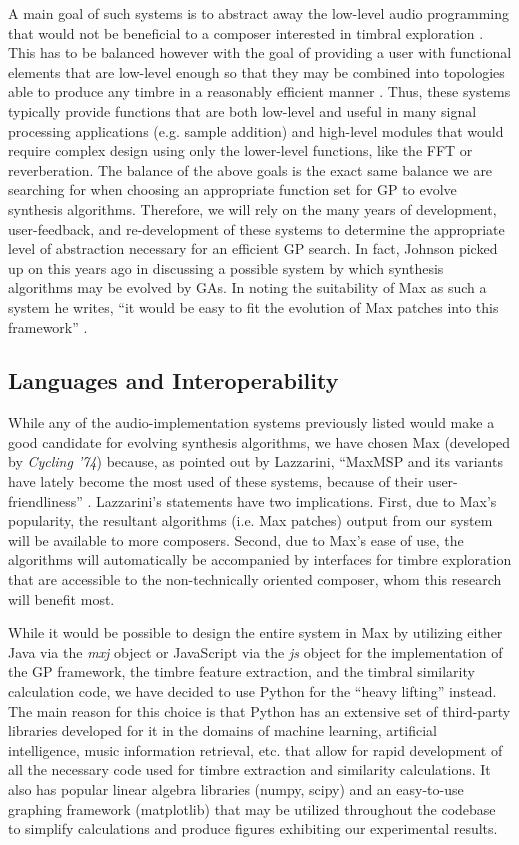 \documentclass[a4paper,12pt]{report} 	%
\numberwithin{figure}{chapter}
\numberwithin{table}{chapter}
\numberwithin{equation}{chapter}
\begin{document}
\begin{flushleft}
A main goal of such systems is to abstract away the low-level audio programming that would not be beneficial to a composer interested in timbral exploration \cite[p. 1]{Moreno:2005bs}. This has to be balanced however with the goal of providing a user with functional elements that are low-level enough so that they may be combined into topologies able to produce any timbre in a reasonably efficient manner \cite[p. 1]{Moreno:2005bs}. Thus, these systems typically provide functions that are both low-level and useful in many signal processing applications (e.g. sample addition) and high-level modules that would require complex design using only the lower-level functions, like the FFT or reverberation. The balance of the above goals is the exact same balance we are searching for when choosing an appropriate function set for GP to evolve synthesis algorithms. Therefore, we will rely on the many years of development, user-feedback, and re-development of these systems to determine the appropriate level of abstraction necessary for an efficient GP search. In fact, Johnson picked up on this years ago in discussing a possible system by which synthesis algorithms may be evolved by GAs. In noting the suitability of Max as such a system he writes, ``it would be easy to fit the evolution of Max patches into this framework'' \cite[p. 6]{Johnson:1998sh}.

\subsection{Languages and Interoperability}
While any of the audio-implementation systems previously listed would make a good candidate for evolving synthesis algorithms, we have chosen Max (developed by \emph{Cycling '74}) because, as pointed out by Lazzarini, ``MaxMSP and its variants have lately become the most used of these systems, because of their user-friendliness'' \cite[p. 356]{Lazzarini:2004qf}. Lazzarini's statements have two implications. First, due to Max's popularity, the resultant algorithms (i.e. Max patches) output from our system will be available to more composers. Second, due to Max's ease of use, the algorithms will automatically be accompanied by interfaces for timbre exploration that are accessible to the non-technically oriented composer, whom this research will benefit most.

While it would be possible to design the entire system in Max by utilizing either Java via the \emph{mxj} object or JavaScript via the \emph{js} object for the implementation of the GP framework, the timbre feature extraction, and the timbral similarity calculation code, we have decided to use Python for the ``heavy lifting'' instead. The main reason for this choice is that Python has an extensive set of third-party libraries developed for it in the domains of machine learning, artificial intelligence, music information retrieval, etc. that allow for rapid development of all the necessary code used for timbre extraction and similarity calculations. It also has popular linear algebra libraries (numpy, scipy) and an easy-to-use graphing framework (matplotlib) that may be utilized throughout the codebase to simplify calculations and produce figures exhibiting our experimental results.


\end{flushleft}
\end{document}
